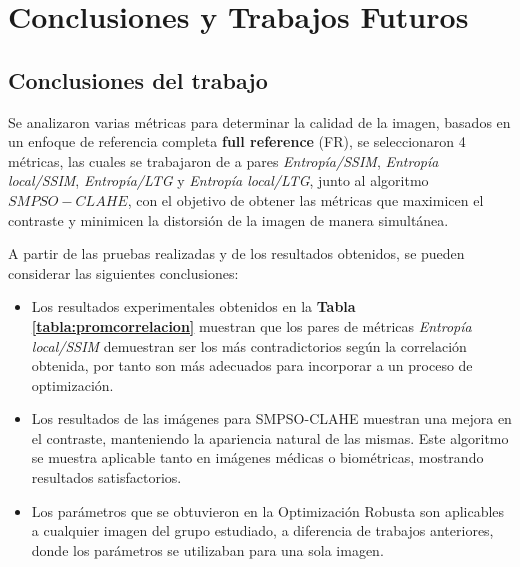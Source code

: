 \def\baselinestretch{1}
\chapter{Conclusiones y Trabajos Futuros}


\section {Conclusiones del trabajo}

Se analizaron varias métricas para determinar la calidad de la imagen, basados en un enfoque de referencia completa \textbf{full reference} (FR), se seleccionaron 4 métricas, las cuales se trabajaron de a pares {\it Entropía/SSIM}, {\it Entropía local/SSIM}, {\it Entropía/LTG} y {\it Entropía local/LTG}, junto al algoritmo $SMPSO-CLAHE$, con el objetivo de obtener las métricas que maximicen el contraste y minimicen la distorsión de la imagen de manera simultánea.

A partir de las pruebas realizadas y de los resultados obtenidos, se pueden considerar las siguientes conclusiones:

\begin{itemize}
\item Los resultados experimentales obtenidos en la \textbf{Tabla \ref{tabla:promcorrelacion}} muestran que los pares de métricas {\it Entropía local/SSIM} demuestran ser los más contradictorios según la correlación obtenida, por tanto son más adecuados para incorporar a un proceso de optimización. \newline
\item Los resultados de las imágenes para SMPSO-CLAHE muestran una mejora en el contraste, manteniendo la apariencia natural de las mismas. Este algoritmo se muestra aplicable tanto en imágenes médicas o biométricas, mostrando resultados satisfactorios.\newline
\item Los parámetros que se obtuvieron en la Optimización Robusta son aplicables a cualquier imagen del grupo estudiado, a diferencia de trabajos anteriores, donde los parámetros se utilizaban para una sola imagen.
\end{itemize}


